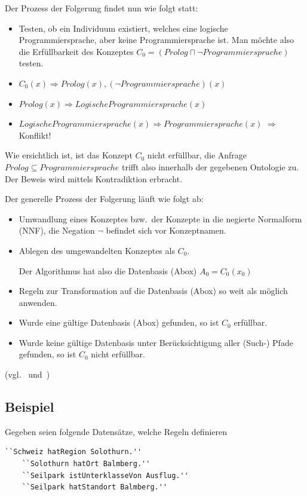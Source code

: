 Der Prozess der Folgerung findet nun wie folgt statt:
\begin{itemize}
    \item Testen, ob ein Individuum existiert, welches eine logische Programmiersprache, aber keine Programmiersprache ist. Man möchte also die Erfüllbarkeit des Konzeptes $ C_0 = (Prolog \sqcap \neg Programmiersprache) $ testen.
    \item $ C_0(x) \Rightarrow Prolog(x), (\neg Programmiersprache)(x) $
    \item $ Prolog(x) \Rightarrow LogischeProgrammiersprache(x) $
    \item $ LogischeProgrammiersprache(x) \Rightarrow Programmiersprache(x) $
        $ \Rightarrow $ Konflikt!
\end{itemize}
Wie ersichtlich ist, ist das Konzept $ C_0 $ nicht erfüllbar, die Anfrage $ Prolog \subseteq Programmiersprache $ trifft also innerhalb der gegebenen Ontologie zu. Der Beweis wird mittels Kontradiktion erbracht.

Der generelle Prozess der Folgerung läuft wie folgt ab:
\begin{itemize}
    \item Umwandlung eines Konzeptes bzw.\ der Konzepte in die negierte Normalform (NNF), die Negation $ \neg $ befindet sich vor Konzeptnamen.
    \item Ablegen des umgewandelten Konzeptes als $ C_0 $.

        Der Algorithmus hat also die Datenbasis (Abox) $ A_0 = {C_0(x_0)} $
    \item Regeln zur Transformation auf die Datenbasis (Abox) so weit als möglich anwenden.
    \item Wurde eine gültige Datenbasis (Abox) gefunden, so ist $ C_0 $ erfüllbar.
    \item Wurde keine gültige Datenbasis unter Berücksichtigung aller (Such-) Pfade gefunden, so ist $ C_0 $ nicht erfüllbar.
\end{itemize} (vgl.~\cite{horrocks2002} und~\cite{horrocks2005})

\subsection{Beispiel}
\label{subsec:inferenz_beispiel}

Gegeben seien folgende Datensätze, welche Regeln definieren

\begin{lstlisting}[caption={Aussagentripel bestehend aus Objekt, Prädikat und Subjekt},captionpos=b,label=lst:reasoning_seilpark]
    ``Schweiz hatRegion Solothurn.''
    ``Solothurn hatOrt Balmberg.''
    ``Seilpark istUnterklasseVon Ausflug.''
    ``Seilpark hatStandort Balmberg.''
\end{lstlisting}

